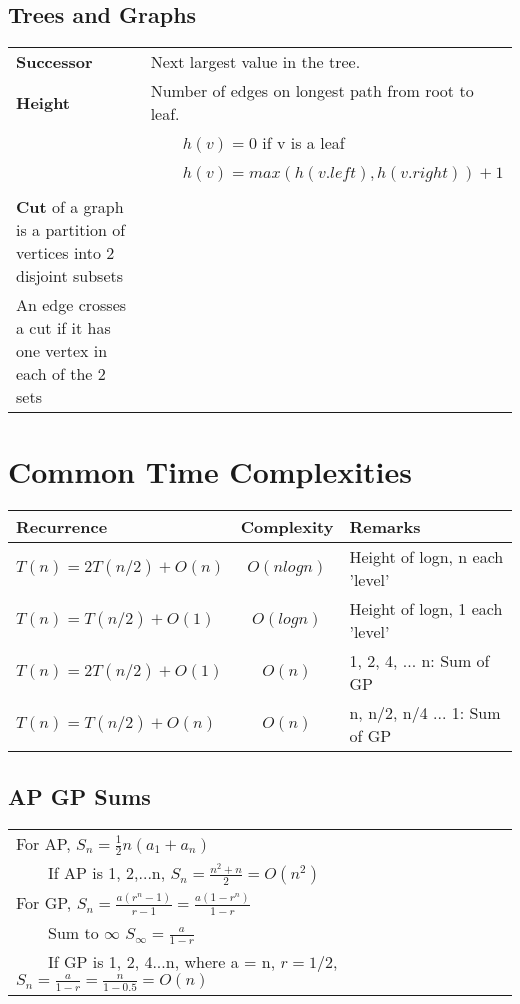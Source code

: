 \documentclass{article}
\newcommand{\tabitem}{~~\llap{\textbullet}~~}
\begin{document}
    \subsection{Trees and Graphs}

    \begin{tabular}{ll}
        \textbf{Successor} & Next largest value in the tree.\\
        \textbf{Height} & Number of edges on longest path from root to leaf.\\
        & \tabitem $h(v) = 0$ if v is a leaf\\
        & \tabitem $h(v) = max(h(v.left), h(v.right)) + 1$\\\\
        \textbf{Cut} of a graph is a partition of vertices into 2 disjoint subsets\\
        An edge crosses a cut if it has one vertex in each of the 2 sets\\
    \end{tabular}

    

    \pagebreak

    \section{Common Time Complexities}


    \begin{tabular}{|l|c|l|}
        \toprule
        \textbf{Recurrence} & \textbf{Complexity} & \textbf{Remarks}\\
        \toprule
        $T(n) = 2T(n/2) + O(n)$ & $O(nlogn)$ & Height of logn, n each 'level'\\
        \midrule
        $T(n) = T(n / 2) + O(1)$ & $O(logn)$ & Height of logn, 1 each 'level'\\
        \midrule
        $T(n) = 2T(n / 2) + O(1)$ & $O(n)$ & 1, 2, 4, ... n: Sum of GP\\
        \midrule
        $T(n) = T(n / 2) + O(n)$ & $O(n)$ & n, n/2, n/4 ... 1: Sum of GP\\ 
        \bottomrule
    \end{tabular}

    \subsection{AP GP Sums}

    \begin{tabular}{l}
        \toprule
        For AP, $S_{n} = \frac{1}{2}n(a_{1} + a_{n})$\\
        \tabitem If AP is 1, 2,...n, $S_{n} = \frac{n^{2} + n}{2} = O(n^{2})$\\
        \midrule
        For GP, $S_{n} = \frac{a(r^{n}-1)}{r-1} = \frac{a(1 - r^{n})}{1- r}$\\
        \tabitem Sum to $\infty$ $S_{\infty} = \frac{a}{1-r}$\\
        \tabitem If GP is 1, 2, 4...n, where a = n, $r = 1/2$, $S_{n} = \frac{a}{1-r} = \frac{n}{1-0.5} = O(n)$\\
    \end{tabular}
\end{document}
